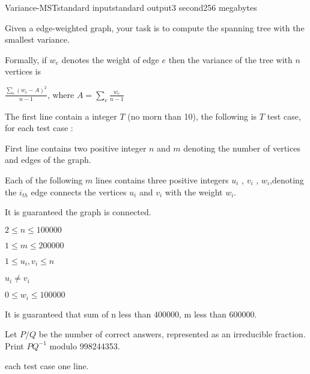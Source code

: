 \begin{problem}{Variance-MST}{standard input}{standard output}{3 second}{256 megabytes}

Given a edge-weighted graph, your task is to compute the spanning tree with the smallest variance.

Formally, if $w_{e}$ denotes the weight of edge $e$ then the variance of the tree with $n$ vertices is

$\frac{\sum\limits_{e}(w_e - A)^{2}}{n - 1}$, where $A = \sum\limits_{e}\frac{w_e}{n - 1}$

\InputFile
The first line contain a integer $T$ (no morn than 10), the following is $T$ test case, for each test case :

First line contains two positive integer $n$ and $m$ denoting the number of vertices and edges of the graph.

Each of the following $m$ lines contains three positive integers $u_{i}$ , $v_{i}$ , $w_{i}$,denoting the $i_{th}$ edge connects the vertices $u_{i}$ and $v_{i}$ with the weight $w_{i}$.

It is guaranteed the graph is connected.

$2 \leq n \leq 100000$

$1 \leq m \leq 200000$

$1 \leq u_{i}, v_{i} \leq n$

$u_{i} \ne v_{i}$

$0 \leq w_{i} \leq 100000$

It is guaranteed that sum of n less than 400000, m less than 600000.

\OutputFile
Let $P / Q$ be the number of correct answers, represented as an irreducible fraction. Print $PQ^{-1}$ modulo 998244353.

each test case one line.

\Example

\begin{example}
%
\end{example}

\end{problem}

